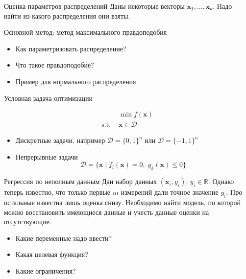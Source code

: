 \documentclass{beamer}
\newcommand{\bx}{\mathbf{x}}
\begin{document}
\begin{frame}{Оценка параметров распределений}
Даны некоторые векторы $\bx_1,\ldots, \bx_k$.
Надо найти из какого распределения они взяты.

\pause

\begin{center}
Основной метод: метод максимального правдоподобия
\end{center}

\pause

\begin{itemize}[<+->]
\item Как параметризовать распределение?
\item Что такое правдоподобие?
\item Пример для нормального распределения
\end{itemize}

\end{frame}

\begin{frame}{Условная задача оптимизации}

\begin{equation*}
\begin{split}
& \min f(\bx)\\
\text{s.t. } & \bx \in \mathcal{D}
\end{split}
\end{equation*}

\begin{itemize}
\item Дискретные задачи, например $\mathcal{D} = \{ 0, 1 \}^n$ или $\mathcal{D} = \{ -1, 1 \}^n$
\item Непрерывные задачи
\begin{equation*}
\mathcal{D} = \{ \bx \mid f_i(\bx) = 0, \; g_k(\bx) \leq 0 \}
\end{equation*}
\end{itemize}

\end{frame}

\begin{frame}{Регрессия по неполным данным}
Дан набор данных $(\bx_i, y_i)$, $y_i \in \mathbb{R}$.
Однако теперь известно, что только первые $m$ измерений дали точное значение $y_i$.
Про остальные известна лишь оценка снизу.
Необходимо найти модель, по которой можно восстановить имеющиеся данные и учесть данные оценки на отсутствующие.
\pause
\begin{itemize}[<+->]
\item Какие переменные надо ввести?
\item Какая целевая функция?
\item Какие ограничения?
\end{itemize}

\end{frame}
\end{document}
